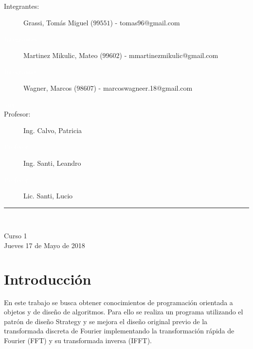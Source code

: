 \documentclass[12pt,a4paper]{report}
\begin{document}
\begin{titlepage}
\begin{center}
			\begin{large}
				\begin{description}
					\item[\hspace{0.15 cm}Integrantes:]
						Grassi, Tomás Miguel ($99551$) - tomas96@gmail.com 					
					\item[\hspace{0.15 cm}\textcolor{white}{Integrantes:}]
						Martinez Mikulic, Mateo ($99602$) - mmartinezmikulic@gmail.com
					\item[\hspace{0.15 cm}\textcolor{white}{Integrantes:}]
						Wagner, Marcos ($98607$) - marcoswagneer.18@gmail.com
					\item[\hspace{1.4 cm}\textcolor{white}{aux}]
					\item[\hspace{0.10 cm}Profesor:]
						Ing. Calvo, Patricia
					\item[\hspace{0.10 cm}\textcolor{white}{Profesor:}]	
						Ing. Santi, Leandro
					\item[\hspace{0.10 cm}\textcolor{white}{Profesor:}]	
						Lic. Santi, Lucio
				\end{description}
			\end{large}
			
		
		\vspace*{0.8 cm}
	
		\rule{80mm}{0.1mm}\\
	
		\vspace*{0.1in}
	
			\begin{large}
				Curso 1 \\
				Jueves 17 de Mayo de 2018 \\
			\end{large}
		
	\end{center}

\end{titlepage}		

	\section{Introducción}	
		
		\indent En este trabajo se busca obtener conocimientos de programación orientada a objetos y de diseño de algoritmos. Para ello se
		realiza un programa utilizando el patrón de diseño Strategy y se mejora el diseño original previo de la transformada discreta de Fourier
		implementando la transformación rápida de Fourier (FFT) y su transformada inversa (IFFT).
		
\end{document}
